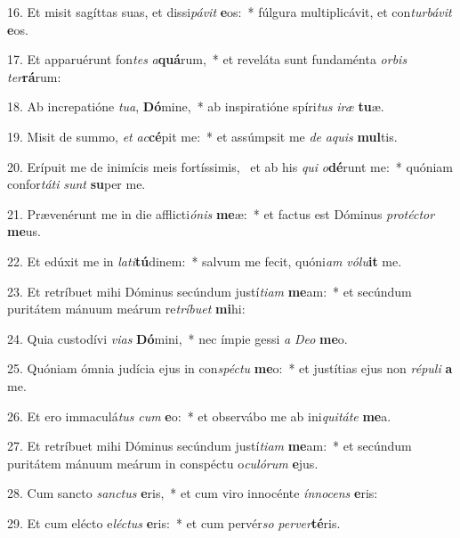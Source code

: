 16. Et misit sagíttas suas, et dissi\textit{pá}\textit{vit} \textbf{e}os:~*  fúlgura multiplicávit, et con\textit{tur}\textit{bá}\textit{vit} \textbf{e}os.\

17. Et apparuérunt fon\textit{tes} \textit{a}\textbf{quá}rum,~*  et reveláta sunt fundaménta \textit{or}\textit{bis} \textit{ter}\textbf{rá}rum:\

18. Ab increpatióne \textit{tu}\textit{a}, \textbf{Dó}mine,~*  ab inspiratióne spíri\textit{tus} \textit{i}\textit{ræ} \textbf{tu}æ.\

19. Misit de summo, \textit{et} \textit{ac}\textbf{cé}pit me:~*  et assúmpsit me \textit{de} \textit{a}\textit{quis} \textbf{mul}tis.\

20. Erípuit me de inimícis meis fortíssimis, \dag\  et ab his \textit{qui} \textit{o}\textbf{dé}runt me:~*  quóniam confor\textit{tá}\textit{ti} \textit{sunt} \textbf{su}per me.\

21. Prævenérunt me in die afflicti\textit{ó}\textit{nis} \textbf{me}æ:~*  et factus est Dóminus \textit{pro}\textit{téc}\textit{tor} \textbf{me}us.\

22. Et edúxit me in \textit{la}\textit{ti}\textbf{tú}dinem:~*  salvum me fecit, quóni\textit{am} \textit{vó}\textit{lu}\textbf{it} me.\

23. Et retríbuet mihi Dóminus secúndum justí\textit{ti}\textit{am} \textbf{me}am:~*  et secúndum puritátem mánuum meárum re\textit{trí}\textit{bu}\textit{et} \textbf{mi}hi:\

24. Quia custodívi \textit{vi}\textit{as} \textbf{Dó}mini,~*  nec ímpie gessi \textit{a} \textit{De}\textit{o} \textbf{me}o.\

25. Quóniam ómnia judícia ejus in con\textit{spéc}\textit{tu} \textbf{me}o:~*  et justítias ejus non \textit{ré}\textit{pu}\textit{li} \textbf{a} me.\

26. Et ero immaculá\textit{tus} \textit{cum} \textbf{e}o:~*  et observábo me ab ini\textit{qui}\textit{tá}\textit{te} \textbf{me}a.\

27. Et retríbuet mihi Dóminus secúndum justí\textit{ti}\textit{am} \textbf{me}am:~*  et secúndum puritátem mánuum meárum in conspéctu o\textit{cu}\textit{ló}\textit{rum} \textbf{e}jus.\

28. Cum sancto \textit{sanc}\textit{tus} \textbf{e}ris,~*  et cum viro innocénte \textit{ín}\textit{no}\textit{cens} \textbf{e}ris:\

29. Et cum elécto e\textit{léc}\textit{tus} \textbf{e}ris:~*  et cum pervér\textit{so} \textit{per}\textit{ver}\textbf{té}ris.\

